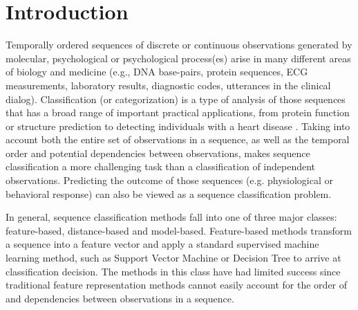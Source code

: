 \documentclass{amia_summit_2018}
\begin{document}
\section*{Introduction}
Temporally ordered sequences of discrete or continuous observations generated by molecular, psychological or psychological process(es) arise in many different areas of biology and medicine (e.g., DNA base-pairs, protein sequences, ECG measurements, laboratory results, diagnostic codes, utterances in the clinical dialog). Classification (or categorization) is a type of analysis of those sequences that has a broad range of important practical applications, from protein function \cite{yakhnenko2005discriminatively} or structure \cite{deshpande2002evaluation} prediction to detecting individuals with a heart disease \cite{wei2006semi}. Taking into account both the entire set of observations in a sequence, as well as the temporal order and potential dependencies between observations, makes sequence classification a more challenging task than a classification of independent observations. Predicting the outcome of those sequences (e.g. physiological or behavioral response) can also be viewed as a sequence classification problem.

In general, sequence classification methods fall into one of three major classes: feature-based, distance-based and model-based. Feature-based methods transform a sequence into a feature vector and apply a standard supervised machine learning method, such as Support Vector Machine \cite{leslie2004fast} or Decision Tree \cite{chuzhanova1998feature} to arrive at classification decision. The methods in this class have had limited success since traditional feature representation methods cannot easily account for the order of and dependencies between observations in a
sequence.
\end{document}
